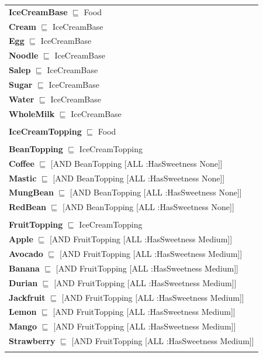 \documentclass[12pt]{article}
\begin{document}
\begin{tabularx}{1\textwidth}{@{}X@{}}
            
            \textbf{IceCreamBase} $\sqsubseteq$ Food \\
                \textbf{Cream} $\sqsubseteq$ IceCreamBase \\
                \textbf{Egg} $\sqsubseteq$ IceCreamBase \\
                \textbf{Noodle} $\sqsubseteq$ IceCreamBase \\
                \textbf{Salep} $\sqsubseteq$ IceCreamBase \\
                \textbf{Sugar} $\sqsubseteq$ IceCreamBase \\
                \textbf{Water} $\sqsubseteq$ IceCreamBase \\
                \textbf{WholeMilk} $\sqsubseteq$ IceCreamBase \\ \tabularnewline
            
            \textbf{IceCreamTopping} $\sqsubseteq$ Food \\ \tabularnewline
            
            \textbf{BeanTopping} $\sqsubseteq$ IceCreamTopping \\
                \textbf{Coffee} $\sqsubseteq$ [AND BeanTopping [ALL :HasSweetness None]] \\
                \textbf{Mastic} $\sqsubseteq$ [AND BeanTopping [ALL :HasSweetness None]] \\
                \textbf{MungBean} $\sqsubseteq$ [AND BeanTopping [ALL :HasSweetness None]] \\
                \textbf{RedBean} $\sqsubseteq$ [AND BeanTopping [ALL :HasSweetness None]] \\ \tabularnewline
            
            \textbf{FruitTopping} $\sqsubseteq$ IceCreamTopping \\
                \textbf{Apple} $\sqsubseteq$ [AND FruitTopping [ALL :HasSweetness Medium]] \\
                \textbf{Avocado} $\sqsubseteq$ [AND FruitTopping [ALL :HasSweetness Medium]] \\
                \textbf{Banana} $\sqsubseteq$ [AND FruitTopping [ALL :HasSweetness Medium]] \\
                \textbf{Durian} $\sqsubseteq$ [AND FruitTopping [ALL :HasSweetness Medium]] \\
                \textbf{Jackfruit} $\sqsubseteq$ [AND FruitTopping [ALL :HasSweetness Medium]] \\
                \textbf{Lemon} $\sqsubseteq$ [AND FruitTopping [ALL :HasSweetness Medium]] \\
                \textbf{Mango} $\sqsubseteq$ [AND FruitTopping [ALL :HasSweetness Medium]] \\
                \textbf{Strawberry} $\sqsubseteq$ [AND FruitTopping [ALL :HasSweetness Medium]] \\ \tabularnewline
            

\end{tabularx}
\end{document}
